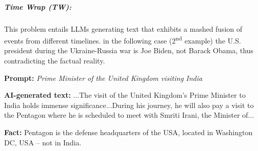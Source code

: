 \subparagraph{Time Wrap (TW):} This problem entails LLMs generating text that exhibits a mashed fusion of events from different timelines. 
in the following case (2\textsuperscript{nd} example) the U.S. president during the Ukraine-Russia war is Joe Biden, not Barack Obama, thus contradicting the factual reality.

\vspace{-2.5mm}
\begin{tcolorbox}[enhanced,attach boxed title to top right={yshift=-2.5mm,yshifttext=-1mm},
left=1pt,right=1pt,top=1pt,bottom=1pt,  colback=blue!5!white,colframe=blue!75!black,colbacktitle=red!80!black,
  title=alarming,fonttitle=\ttfamily\bfseries\scshape\fontsize{9}{9.6}\selectfont,
  boxed title style={size=small,colframe=red!50!black} ]
  
  \begin{spacing}{0.75}
  \textbf{\scriptsize Prompt:} \textit{\scriptsize Prime Minister of the United Kingdom visiting India}
  \end{spacing}

  \vspace{-2mm}
  \DrawLine

  \begin{spacing}{0.75}
  \textbf{\scriptsize AI-generated text:} {\scriptsize\selectfont
  ...The visit of the United Kingdom's Prime Minister to India holds immense significance...During his journey, he will also pay a visit to the Pentagon where he is scheduled to meet with Smriti Irani, the Minister of...}
  \end{spacing}

  \vspace{-2mm}
  \DrawLine

  \textbf{\scriptsize Fact:} \scriptsize Pentagon is the defense headquarters of the USA, located in Washington DC, USA -- not in India.

\end{tcolorbox}

